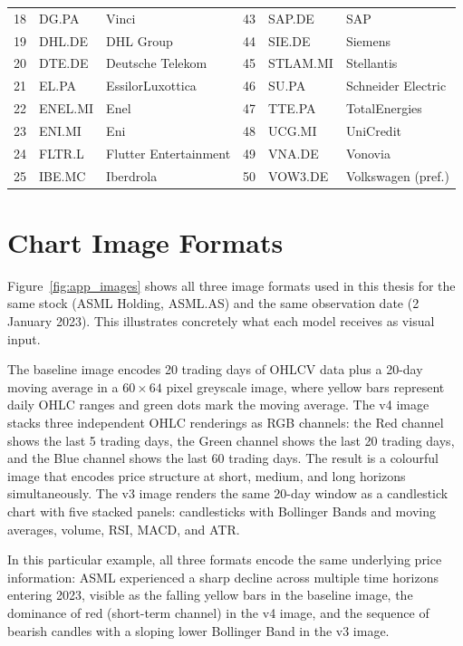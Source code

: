 \begin{table}[H]
{\begin{tabular}{rll@{\hspace{0.8cm}}rll}
18  & DG.PA     & Vinci                   & 43 & SAP.DE    & SAP                    \\
19  & DHL.DE    & DHL Group               & 44 & SIE.DE    & Siemens                \\
20  & DTE.DE    & Deutsche Telekom        & 45 & STLAM.MI  & Stellantis             \\
21  & EL.PA     & EssilorLuxottica        & 46 & SU.PA     & Schneider Electric     \\
22  & ENEL.MI   & Enel                    & 47 & TTE.PA    & TotalEnergies          \\
23  & ENI.MI    & Eni                     & 48 & UCG.MI    & UniCredit              \\
24  & FLTR.L    & Flutter Entertainment   & 49 & VNA.DE    & Vonovia                \\
25  & IBE.MC    & Iberdrola               & 50 & VOW3.DE   & Volkswagen (pref.)     \\
\bottomrule
\end{tabular}%
}
\end{table}

\newpage
\section{Chart Image Formats}
\label{app:images}

Figure~\ref{fig:app_images} shows all three image formats used in this thesis for the same stock (ASML Holding, ASML.AS) and the same observation date (2 January 2023). This illustrates concretely what each model receives as visual input.

The baseline image encodes 20 trading days of OHLCV data plus a 20-day moving average in a $60 \times 64$ pixel greyscale image, where yellow bars represent daily OHLC ranges and green dots mark the moving average. The v4 image stacks three independent OHLC renderings as RGB channels: the Red channel shows the last 5 trading days, the Green channel shows the last 20 trading days, and the Blue channel shows the last 60 trading days. The result is a colourful image that encodes price structure at short, medium, and long horizons simultaneously. The v3 image renders the same 20-day window as a candlestick chart with five stacked panels: candlesticks with Bollinger Bands and moving averages, volume, RSI, MACD, and ATR.

In this particular example, all three formats encode the same underlying price information: ASML experienced a sharp decline across multiple time horizons entering 2023, visible as the falling yellow bars in the baseline image, the dominance of red (short-term channel) in the v4 image, and the sequence of bearish candles with a sloping lower Bollinger Band in the v3 image.

